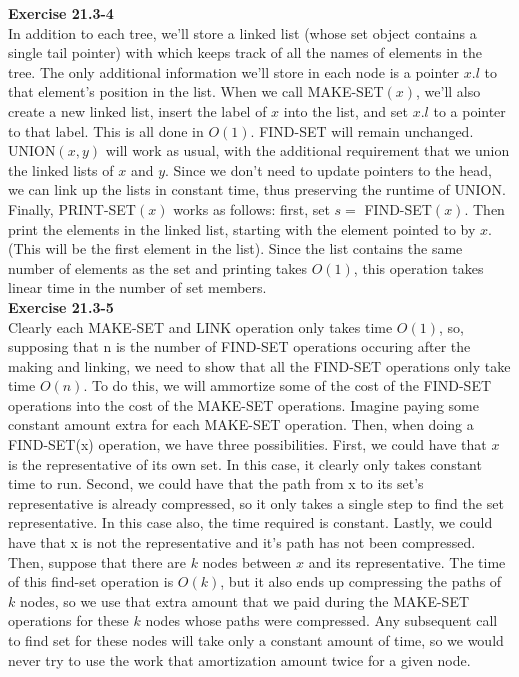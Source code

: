 \documentclass{article}
\begin{document}
\noindent\textbf{Exercise 21.3-4}\\

In addition to each tree, we'll store a linked list (whose set object contains a single tail pointer) with which keeps track of all the names of elements in the tree.  The only additional information we'll store in each node is a pointer $x.l$ to that element's position in the list.  When we call MAKE-SET$(x)$, we'll also create a new linked list, insert the label of $x$ into the list, and set $x.l$ to a pointer to that label.  This is all done in $O(1)$.  FIND-SET will remain unchanged.  UNION$(x,y)$ will work as usual, with the additional requirement that we union the linked lists of $x$ and $y$. Since we don't need to update pointers to the head, we can link up the lists in constant time, thus preserving the runtime of UNION.   Finally, PRINT-SET$(x)$ works as follows: first, set $s = $ FIND-SET$(x)$.  Then print the elements in the linked list, starting with the element pointed to by $x$.  (This will be the first element in the list).  Since the list contains the same number of elements as the set and printing takes $O(1)$, this operation takes linear time in the number of set members. \\

\noindent\textbf{Exercise 21.3-5}\\

Clearly each MAKE-SET and LINK operation only takes time $O(1)$, so, supposing that n is the number of FIND-SET operations occuring after the making and linking, we need to show that all the FIND-SET operations only take time $O(n)$. To do this, we will ammortize some of the cost of the FIND-SET operations into the cost of the MAKE-SET operations. Imagine paying some constant amount extra for each MAKE-SET operation. Then, when doing a FIND-SET(x) operation, we have three possibilities. First, we could have that $x$ is the representative of its own set. In this case, it clearly only takes constant time to run. Second, we could have that the path from x to its set's representative is already compressed, so it only takes a single step to find the set representative. In this case also, the time required is constant. Lastly, we could have that x is not the representative and it's path has not been compressed. Then, suppose that there are $k$ nodes between $x$ and its representative. The time of this find-set operation is $O(k)$, but it also ends up compressing the paths of $k$ nodes, so we use that extra amount that we paid during the MAKE-SET operations for these $k$ nodes whose paths were compressed. Any subsequent call to find set for these nodes will take only a constant amount of time, so we would never try to use the work that amortization amount twice for a given node.\\
\end{document}
